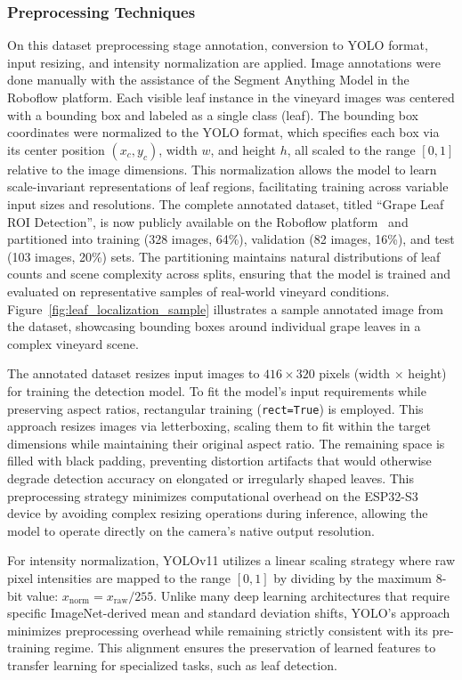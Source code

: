 \subsubsection*{Preprocessing Techniques}
On this dataset preprocessing stage annotation, conversion to YOLO format, input resizing, and intensity normalization are applied. Image annotations were done manually with the assistance of the Segment Anything Model in the Roboflow platform. Each visible leaf instance in the vineyard images was centered with a bounding box and labeled as a single class (leaf). The bounding box coordinates were normalized to the YOLO format, which specifies each box via its center position $(x_c, y_c)$, width $w$, and height $h$, all scaled to the range $[0, 1]$ relative to the image dimensions. This normalization allows the model to learn scale-invariant representations of leaf regions, facilitating training across variable input sizes and resolutions. The complete annotated dataset, titled ``Grape Leaf ROI Detection'', is now publicly available on the Roboflow platform~\cite{roboflow_grape_leaf_2026} and partitioned into training (328 images, 64\%), validation (82 images, 16\%), and test (103 images, 20\%) sets. The partitioning maintains natural distributions of leaf counts and scene complexity across splits, ensuring that the model is trained and evaluated on representative samples of real-world vineyard conditions. Figure~\ref{fig:leaf_localization_sample} illustrates a sample annotated image from the dataset, showcasing bounding boxes around individual grape leaves in a complex vineyard scene. 


The annotated dataset resizes input images to $416 \times 320$ pixels (width $\times$ height) for training the detection model. To fit the model's input requirements while preserving aspect ratios, rectangular training (\texttt{rect=True}) is employed. This approach resizes images via letterboxing, scaling them to fit within the target dimensions while maintaining their original aspect ratio. The remaining space is filled with black padding, preventing distortion artifacts that would otherwise degrade detection accuracy on elongated or irregularly shaped leaves. This preprocessing strategy minimizes computational overhead on the ESP32-S3 device by avoiding complex resizing operations during inference, allowing the model to operate directly on the camera's native output resolution.


For intensity normalization, YOLOv11 utilizes a linear scaling strategy where raw pixel intensities are mapped to the range $[0, 1]$ by dividing by the maximum 8-bit value: $x_{\text{norm}} = x_{\text{raw}}/255$. Unlike many deep learning architectures that require specific ImageNet-derived mean and standard deviation shifts, YOLO's approach minimizes preprocessing overhead while remaining strictly consistent with its pre-training regime. This alignment ensures the preservation of learned features to transfer learning for specialized tasks, such as leaf detection.

